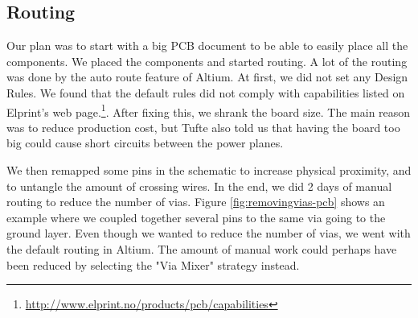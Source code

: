 \subsection {Routing}
\label{sec: pcb_routing}

Our plan was to start with a big PCB document to be able to easily place all the components. We placed the components and started routing. A lot of the routing was done by the auto route feature of Altium. At first, we did not set any Design Rules. We found that the default rules did not comply with capabilities listed on Elprint's web page.\footnote {\url{http://www.elprint.no/products/pcb/capabilities}}. After fixing this, we shrank the board size. The main reason was to reduce production cost, but Tufte also told us that having the board too big could cause short circuits between the power planes.

We then remapped some pins in the schematic to increase physical proximity, and to untangle the amount of crossing wires. In the end, we did 2 days of manual routing to reduce the number of vias. Figure \ref{fig:removingvias-pcb} shows an example where we coupled together several pins to the same via going to the ground layer. Even though we wanted to reduce the number of vias, we went with the default routing in Altium. The amount of manual work could perhaps have been reduced by selecting the "Via Mixer" strategy instead. 


